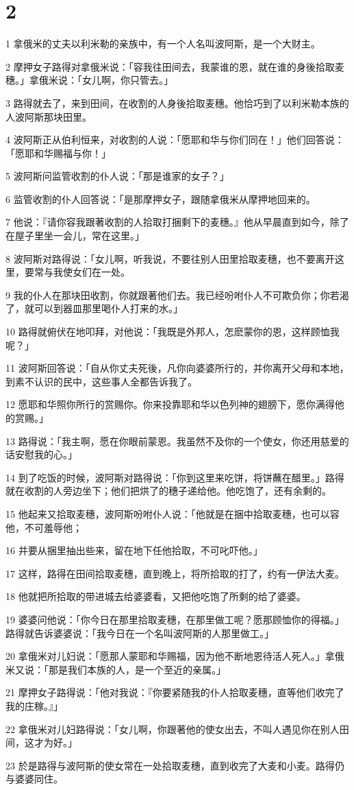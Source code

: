 \chapter{2}

\par 1 拿俄米的丈夫以利米勒的亲族中，有一个人名叫波阿斯，是一个大财主。
\par 2 摩押女子路得对拿俄米说：「容我往田间去，我蒙谁的恩，就在谁的身後拾取麦穗。」拿俄米说：「女儿啊，你只管去。」
\par 3 路得就去了，来到田间，在收割的人身後拾取麦穗。他恰巧到了以利米勒本族的人波阿斯那块田里。
\par 4 波阿斯正从伯利恒来，对收割的人说：「愿耶和华与你们同在！」他们回答说：「愿耶和华赐福与你！」
\par 5 波阿斯问监管收割的仆人说：「那是谁家的女子？」
\par 6 监管收割的仆人回答说：「是那摩押女子，跟随拿俄米从摩押地回来的。
\par 7 他说：『请你容我跟著收割的人拾取打捆剩下的麦穗。』他从早晨直到如今，除了在屋子里坐一会儿，常在这里。」
\par 8 波阿斯对路得说：「女儿啊，听我说，不要往别人田里拾取麦穗，也不要离开这里，要常与我使女们在一处。
\par 9 我的仆人在那块田收割，你就跟著他们去。我已经吩咐仆人不可欺负你；你若渴了，就可以到器皿那里喝仆人打来的水。」
\par 10 路得就俯伏在地叩拜，对他说：「我既是外邦人，怎麽蒙你的恩，这样顾恤我呢？」
\par 11 波阿斯回答说：「自从你丈夫死後，凡你向婆婆所行的，并你离开父母和本地，到素不认识的民中，这些事人全都告诉我了。
\par 12 愿耶和华照你所行的赏赐你。你来投靠耶和华以色列神的翅膀下，愿你满得他的赏赐。」
\par 13 路得说：「我主啊，愿在你眼前蒙恩。我虽然不及你的一个使女，你还用慈爱的话安慰我的心。」
\par 14 到了吃饭的时候，波阿斯对路得说：「你到这里来吃饼，将饼蘸在醋里。」路得就在收割的人旁边坐下；他们把烘了的穗子递给他。他吃饱了，还有余剩的。
\par 15 他起来又拾取麦穗，波阿斯吩咐仆人说：「他就是在捆中拾取麦穗，也可以容他，不可羞辱他；
\par 16 并要从捆里抽出些来，留在地下任他拾取，不可叱吓他。」
\par 17 这样，路得在田间拾取麦穗，直到晚上，将所拾取的打了，约有一伊法大麦。
\par 18 他就把所拾取的带进城去给婆婆看，又把他吃饱了所剩的给了婆婆。
\par 19 婆婆问他说：「你今日在那里拾取麦穗，在那里做工呢？愿那顾恤你的得福。」路得就告诉婆婆说：「我今日在一个名叫波阿斯的人那里做工。」
\par 20 拿俄米对儿妇说：「愿那人蒙耶和华赐福，因为他不断地恩待活人死人。」拿俄米又说：「那是我们本族的人，是一个至近的亲属。」
\par 21 摩押女子路得说：「他对我说：『你要紧随我的仆人拾取麦穗，直等他们收完了我的庄稼。』」
\par 22 拿俄米对儿妇路得说：「女儿啊，你跟著他的使女出去，不叫人遇见你在别人田间，这才为好。」
\par 23 於是路得与波阿斯的使女常在一处拾取麦穗，直到收完了大麦和小麦。路得仍与婆婆同住。


